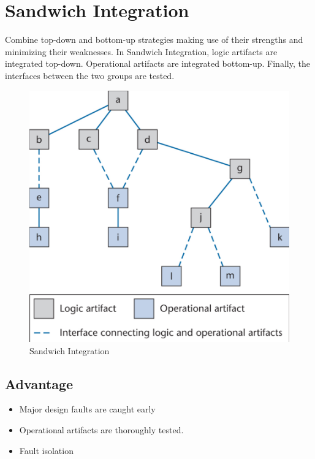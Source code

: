 \documentclass[11pt]{article}
\begin{document}
\newpage
\section*{Sandwich Integration}

Combine top-down and bottom-up strategies making use of their strengths and minimizing their weaknesses. In Sandwich Integration, logic artifacts are integrated top-down. Operational artifacts are integrated bottom-up. Finally, the interfaces between the two groups are tested.

\begin{figure}[h]
	\centering
	\includegraphics[width=0.6\linewidth]{images/Sandwich.png}
	\caption{Sandwich Integration}
	\label{fig:Sandwich}
\end{figure}

\subsection*{Advantage}

\begin{itemize}
	\item
	
	Major design faults are caught early

	\item 
	
	Operational artifacts are thoroughly tested.

	\item
	
	Fault isolation
	
\end{itemize}
\end{document}
